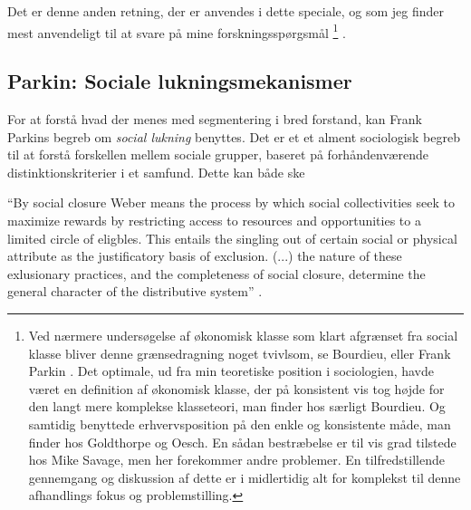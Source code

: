 Det er denne anden retning, der er anvendes i dette speciale, og som jeg finder mest anvendeligt til at svare på mine forskningsspørgsmål%
%
    \footnote{ Ved nærmere undersøgelse af økonomisk klasse som klart afgrænset fra social klasse bliver denne grænsedragning noget tvivlsom, se Bourdieu\citeyear{Bourdieu1987}, eller Frank Parkin \citeyear{Parkin1979}. Det optimale, ud fra min teoretiske position i sociologien, havde været en definition af økonomisk klasse, der på konsistent vis tog højde for den langt mere komplekse klasseteori, man finder hos særligt Bourdieu. Og samtidig benyttede erhvervsposition på den enkle og konsistente måde, man finder hos Goldthorpe og Oesch. En sådan bestræbelse er til vis grad tilstede hos Mike Savage, men her forekommer andre problemer. En tilfredstillende gennemgang og diskussion af dette er i midlertidig alt for komplekst til denne afhandlings fokus og problemstilling.}%
%
. 








\iffalse \label{iffalse}












%
\subsection{Parkin: Sociale lukningsmekanismer}
%

For at forstå hvad der menes med segmentering i bred forstand, kan Frank Parkins begreb om \emph{social lukning}  benyttes. Det er et et alment sociologisk begreb til at forstå forskellen mellem sociale grupper, baseret på forhåndenværende distinktionskriterier i et samfund. \parencite{Parkin1994}  Dette kan både ske 


 \begin{displayquote} “By social closure Weber means the process by which social collectivities seek to maximize rewards by restricting access to resources and opportunities to a limited circle of eligbles. This entails the singling out of certain social or physical attribute as the justificatory basis of exclusion. (...) the nature of these exlusionary practices, and the completeness of social closure, determine the general character of the distributive system” \parencite[44]{Parkin1979}. \end{displayquote}

